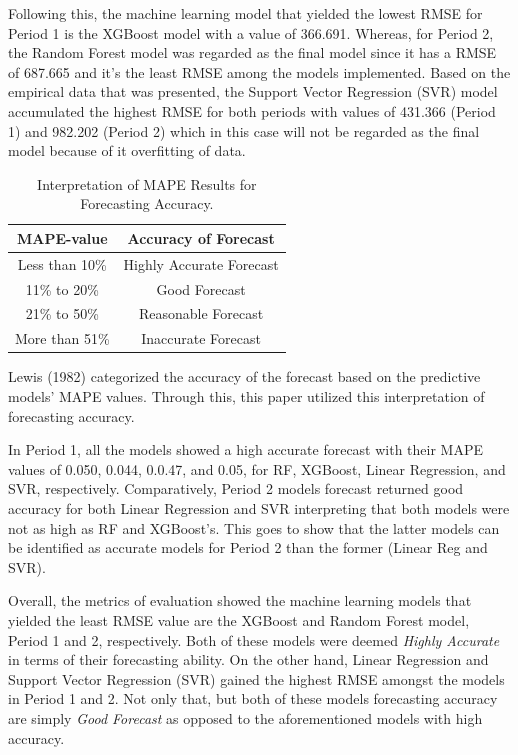 \documentclass[runningheads]{llncs}
\begin{document}
Following this, the machine learning model that yielded the lowest RMSE for Period 1 is the XGBoost model with a value of 366.691.  Whereas, for Period 2, the Random Forest model was regarded as the final model since it has a RMSE of 687.665 and it's the least RMSE among the models implemented. Based on the empirical data that was presented, the Support Vector Regression (SVR) model accumulated the highest RMSE for both periods with values of 431.366 (Period 1) and 982.202 (Period 2) which in this case will not be regarded as the final model because of it overfitting of data.

\begin{center}
\begin{table}[]
    \centering
    \caption{Interpretation of MAPE Results for Forecasting Accuracy.}
    \label{tab:perf}
    \begin{tabular}{cc}
    \hline
    \textbf{MAPE-value}  & \textbf{Accuracy of Forecast} \\
    \hline
    Less than 10\%    & Highly Accurate Forecast\\
    11\% to 20\%    & Good Forecast\\
    21\% to 50\%     & Reasonable Forecast\\
    More than 51\%    & Inaccurate Forecast\\
    \hline
    \end{tabular}
\end{table}
\end{center}

Lewis (1982) categorized the accuracy of the forecast based on the predictive models' MAPE values. Through this, this paper utilized this interpretation of forecasting accuracy. 

In Period 1, all the models showed a high accurate forecast with their MAPE values of 0.050, 0.044, 0.0.47, and 0.05, for RF, XGBoost, Linear Regression, and SVR, respectively. Comparatively, Period 2 models forecast returned good accuracy for both Linear Regression and SVR interpreting that both models were not as high as RF and XGBoost's. This goes to show that the latter models can be identified as accurate models for Period 2 than the former (Linear Reg and SVR).

Overall, the metrics of evaluation showed the machine learning models that yielded the least RMSE value are the XGBoost and Random Forest model, Period 1 and 2, respectively. Both of these models were deemed \textit{Highly Accurate} in terms of their forecasting ability. On the other hand, Linear Regression and Support Vector Regression (SVR) gained the highest RMSE amongst the models in Period 1 and 2. Not only that, but both of these models forecasting accuracy are simply \textit{Good Forecast} as opposed to the aforementioned models with high accuracy.
\end{document}
